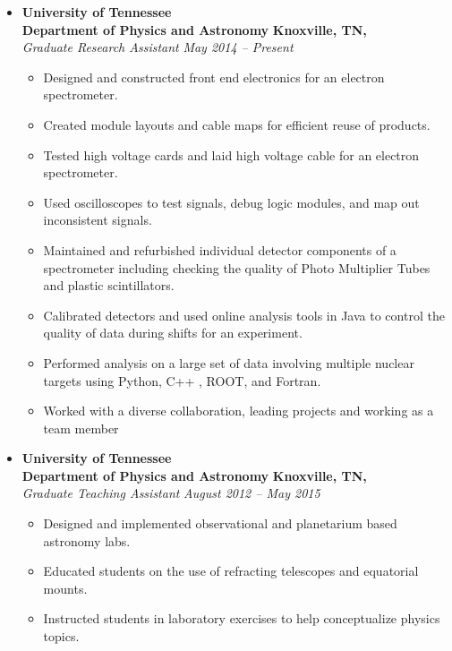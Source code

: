 \begin{itemize}
\parskip=0.1em

\item
\headerrow
{\textbf{University of Tennessee}\\\textbf{Department of Physics and Astronomy }}
{\textbf{  Knoxville, TN,}}
\\
\headerrow
{\emph{Graduate Research Assistant }}
{\emph{May 2014 -- Present}}

\begin{itemize}[leftmargin=-.05in]
	\item Designed and constructed front end electronics for an electron spectrometer.
	\item Created module layouts and cable maps for efficient reuse of products.
	\item Tested high voltage cards and laid high voltage cable for an electron spectrometer.
	\item Used oscilloscopes to test signals, debug logic modules, and map out inconsistent signals.  
	\item Maintained and refurbished individual detector components of a spectrometer including checking the quality of Photo Multiplier Tubes and plastic scintillators.
	\item Calibrated detectors and used online analysis tools in Java to control the quality of data during shifts for an experiment. 
	\item Performed analysis on a large set of data involving multiple nuclear targets using Python, C++ , ROOT, and Fortran. 
	\item Worked with a diverse collaboration, leading projects and working as a team member
\end{itemize}
\vspace{0.85cm}
\item
\headerrow
{\textbf{University of Tennessee}\\\textbf{Department of Physics and Astronomy }}
{\textbf{  Knoxville, TN,}}
\\
\headerrow
{\emph{Graduate Teaching Assistant }}
{\emph{August 2012 -- May 2015}}
\begin{itemize}[leftmargin=-.05in]
	\item Designed and implemented observational and planetarium based astronomy labs.
	\item Educated students on the use of refracting telescopes and equatorial mounts.
	\item Instructed students in laboratory exercises to help conceptualize physics topics.

\end{itemize}
\end{itemize}
